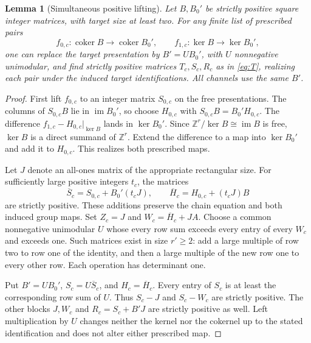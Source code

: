 \documentclass[11pt,letterpaper]{amsart}
\newtheorem{lemma}[theorem]{Lemma}
\theoremstyle{remark}\newtheorem{remark}[theorem]{Remark}
\newcommand{\Z}{\mathbb Z}\newcommand{\C}{\mathbb C}
\newcommand{\coker}{\operatorname{coker}}\newcommand{\rank}{\operatorname{rank}}
\begin{document}
\begin{lemma}[Simultaneous positive lifting]\label{lem:positive}
Let $B,B_0'$ be strictly positive square integer matrices, with target
size at least two. For any finite list of prescribed pairs
\[
 f_{0,c}:\coker B\to\coker B_0',\qquad
 f_{1,c}:\ker B\to\ker B_0',
\]
one can replace the target presentation by $B'=UB_0'$, with $U$
nonnegative unimodular, and find strictly positive matrices $T_c,S_c,R_c$
as in \eqref{eq:T}, realizing each pair under the induced target
identifications. All channels use the same $B'$.
\end{lemma}
\begin{proof}
First lift $f_{0,c}$ to an integer matrix $S_{0,c}$ on the free presentations.
The columns of $S_{0,c}B$ lie in $\operatorname{im}B_0'$, so choose
$H_{0,c}$ with $S_{0,c}B=B_0'H_{0,c}$. The difference
$f_{1,c}-H_{0,c}|_{\ker B}$ lands in $\ker B_0'$. Since
$\Z^r/\ker B\cong\operatorname{im}B$ is free, $\ker B$ is a direct
summand of $\Z^r$. Extend the difference to a map into $\ker B_0'$
and add it to $H_{0,c}$. This realizes both prescribed maps.

Let $J$ denote an all-ones matrix of the appropriate rectangular size.
For sufficiently large positive integers $t_c$, the matrices
\[
 \overline S_c=S_{0,c}+B_0'(t_cJ),\qquad
 \overline H_c=H_{0,c}+(t_cJ)B
\]
are strictly positive. These additions preserve the chain equation and
both induced group maps. Set $Z_c=J$ and
$W_c=\overline H_c+J A$. Choose a common nonnegative unimodular $U$
whose every row sum exceeds every entry of every $W_c$ and exceeds one.
Such matrices exist in size $r'\ge2$: add a large multiple of row two
to row one of the identity, and then a large multiple of the new row one
to every other row. Each operation has determinant one.

Put $B'=UB_0'$, $S_c=U\overline S_c$, and $H_c=\overline H_c$.
Every entry of $S_c$ is at least the corresponding row sum of $U$.
Thus $S_c-J$ and $S_c-W_c$ are strictly positive. The other blocks
$J,W_c$ and $R_c=S_c+B'J$ are strictly positive as well.
Left multiplication by $U$ changes neither the kernel nor the cokernel
up to the stated identification and does not alter either prescribed map.
\end{proof}
\end{document}
